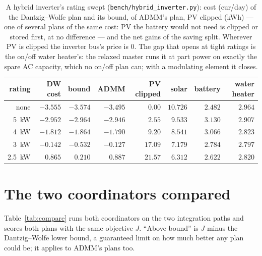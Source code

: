\documentclass[11pt,a4paper]{article}
\begin{document}
\begin{table}[htbp]
\centering
\small
\begin{tabular}{rrrrrrrr}
\toprule
rating & DW cost & bound & ADMM & PV clipped & solar & battery & water heater \\
\midrule
none  & $-3.555$ & $-3.574$ & $-3.495$ & $0.00$  & $10.726$ & $2.482$ & $2.964$ \\
5~kW  & $-2.952$ & $-2.964$ & $-2.946$ & $2.55$  & $9.533$  & $3.130$ & $2.907$ \\
4~kW  & $-1.812$ & $-1.864$ & $-1.790$ & $9.20$  & $8.541$  & $3.066$ & $2.823$ \\
3~kW  & $-0.142$ & $-0.532$ & $-0.127$ & $17.09$ & $7.179$  & $2.784$ & $2.797$ \\
2.5~kW & $0.865$ & $0.210$  & $0.887$  & $21.57$ & $6.312$  & $2.622$ & $2.820$ \\
\bottomrule
\end{tabular}
\caption{A hybrid inverter's rating swept (\texttt{bench/hybrid\_inverter.py}):
cost (cur/day) of the Dantzig--Wolfe plan and its bound, of ADMM's plan, PV
clipped (kWh) --- one of several plans of the same cost: PV the battery would
not need is clipped or stored first, at no difference --- and the net gains of
the saving split. Wherever PV is clipped the
inverter bus's price is $0$. The gap that opens at tight ratings is the on/off
water heater's: the relaxed master runs it at part power on exactly the spare
AC capacity, which no on/off plan can; with a modulating element it closes.}
\label{tab:hybrid}
\end{table}

\section{The two coordinators compared}
\label{sec:compare}

Table~\ref{tab:compare} runs both coordinators on the two integration paths and
scores both plans with the same objective $J$. ``Above bound'' is $J$ minus the
Dantzig--Wolfe lower bound, a guaranteed limit on how much better any plan could
be; it applies to ADMM's plans too.
\end{document}
